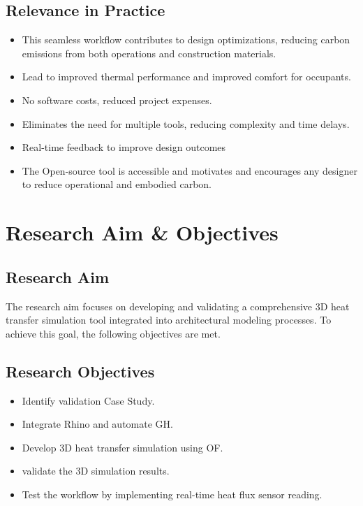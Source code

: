 \subsection{Relevance in Practice}
\begin{itemize}
\item This seamless workflow contributes to design optimizations, reducing carbon emissions from both operations and construction materials.
\item Lead to improved thermal performance and improved comfort for occupants.
\item No software costs, reduced project expenses.
\item Eliminates the need for multiple tools, reducing complexity and time delays.
\item Real-time feedback to improve design outcomes
\item The Open-source tool is accessible and motivates and encourages any designer to reduce operational and embodied carbon.

\end{itemize}
\section{Research Aim \& Objectives}
\subsection{Research Aim}
The research aim focuses on developing and validating a comprehensive 3D heat transfer simulation tool integrated into architectural modeling processes. To achieve this goal, the following objectives are met.

\subsection{Research Objectives}
\begin{itemize}
    \item Identify validation Case Study.
    \item Integrate Rhino and automate \gls{GH}. 
    \item Develop 3D heat transfer simulation using \gls{OF}.
    \item validate the 3D simulation results.
    \item Test the workflow by implementing real-time heat flux sensor reading.
\end{itemize}


